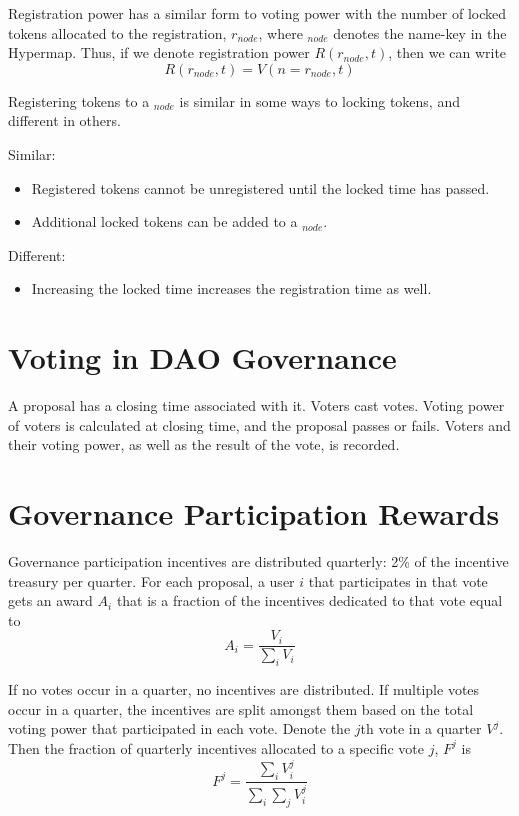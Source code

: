 \documentclass{article}
\begin{document}
Registration power has a similar form to voting power with the number of locked tokens allocated to the registration, $r_{node}$, where $_{node}$ denotes the name-key in the Hypermap.
Thus, if we denote registration power $R(r_{node}, t)$, then we can write
\begin{equation}
R(r_{node}, t) = V(n=r_{node}, t)
\end{equation}

Registering tokens to a $_{node}$ is similar in some ways to locking tokens, and different in others.

Similar:
\begin{itemize}
    \item Registered tokens cannot be unregistered until the locked time has passed.
    \item Additional locked tokens can be added to a $_{node}$.
\end{itemize}

Different:
\begin{itemize}
    \item Increasing the locked time increases the registration time as well.
\end{itemize}

\section{Voting in DAO Governance}

A proposal has a closing time associated with it.
Voters cast votes.
Voting power of voters is calculated at closing time, and the proposal passes or fails.
Voters and their voting power, as well as the result of the vote, is recorded.

\section{Governance Participation Rewards}

Governance participation incentives are distributed quarterly: 2\% of the incentive treasury per quarter.
For each proposal, a user $i$ that participates in that vote gets an award $A_i$ that is a fraction of the incentives dedicated to that vote equal to
\begin{equation}
A_i = \frac{V_i}{\sum_i V_i}
\end{equation}

If no votes occur in a quarter, no incentives are distributed.
If multiple votes occur in a quarter, the incentives are split amongst them based on the total voting power that participated in each vote.
Denote the $j$th vote in a quarter $V^{j}$.
Then the fraction of quarterly incentives allocated to a specific vote $j$, $F^{j}$ is
\begin{equation}
F^{j} = \frac{\sum_i V^{j}_i}{\sum_i \sum_j V^{j}_i}
\end{equation}
\end{document}
